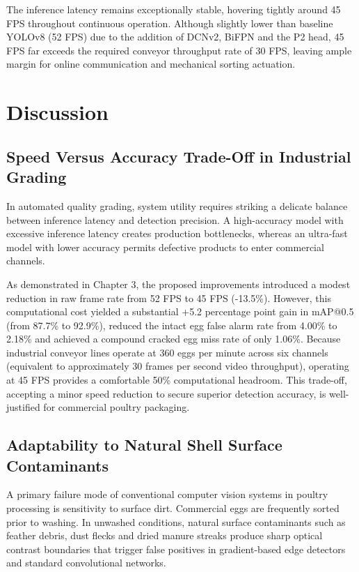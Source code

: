 \documentclass[12pt,a4paper]{report}
\begin{document}
The inference latency remains exceptionally stable, hovering tightly around 45 FPS throughout continuous operation. Although slightly lower than baseline YOLOv8 (52 FPS) due to the addition of DCNv2, BiFPN and the P2 head, 45 FPS far exceeds the required conveyor throughput rate of 30 FPS, leaving ample margin for online communication and mechanical sorting actuation.


\chapter{Discussion}

\section{Speed Versus Accuracy Trade-Off in Industrial Grading}

In automated quality grading, system utility requires striking a delicate balance between inference latency and detection precision. A high-accuracy model with excessive inference latency creates production bottlenecks, whereas an ultra-fast model with lower accuracy permits defective products to enter commercial channels.

As demonstrated in Chapter 3, the proposed improvements introduced a modest reduction in raw frame rate from 52 FPS to 45 FPS (-13.5\%). However, this computational cost yielded a substantial +5.2 percentage point gain in mAP@0.5 (from 87.7\% to 92.9\%), reduced the intact egg false alarm rate from 4.00\% to 2.18\% and achieved a compound cracked egg miss rate of only 1.06\%. Because industrial conveyor lines operate at 360 eggs per minute across six channels (equivalent to approximately 30 frames per second video throughput), operating at 45 FPS provides a comfortable 50\% computational headroom. This trade-off, accepting a minor speed reduction to secure superior detection accuracy, is well-justified for commercial poultry packaging.

\section{Adaptability to Natural Shell Surface Contaminants}

A primary failure mode of conventional computer vision systems in poultry processing is sensitivity to surface dirt. Commercial eggs are frequently sorted prior to washing. In unwashed conditions, natural surface contaminants such as feather debris, dust flecks and dried manure streaks produce sharp optical contrast boundaries that trigger false positives in gradient-based edge detectors and standard convolutional networks.
\end{document}
